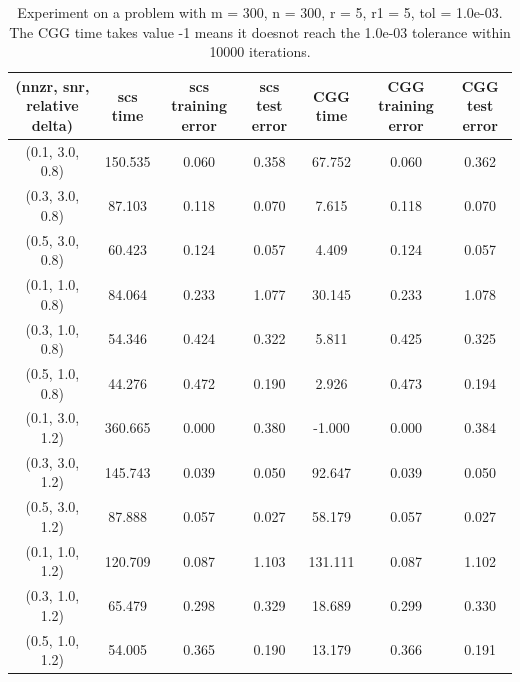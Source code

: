 \documentclass[english]{article}
\begin{document}
\begin{table}[H] 
	\centering
	\label{MC-side-information}
	\begin{tabular}{ccccccc}
		\toprule
		(nnzr, snr, relative delta) &scs time &scs training error &scs test error &CGG time &CGG training error &CGG test error\\ 
		\midrule 
		(0.1, 3.0, 0.8)& 150.535  &0.060  &0.358  &67.752  &0.060  &0.362 \\ 
		(0.3, 3.0, 0.8)& 87.103  &0.118  &0.070  &7.615  &0.118  &0.070 \\ 
		(0.5, 3.0, 0.8)& 60.423  &0.124  &0.057  &4.409  &0.124  &0.057 \\ 
		(0.1, 1.0, 0.8)& 84.064  &0.233  &1.077  &30.145  &0.233  &1.078 \\ 
		(0.3, 1.0, 0.8)& 54.346  &0.424  &0.322  &5.811  &0.425  &0.325 \\ 
		(0.5, 1.0, 0.8)& 44.276  &0.472  &0.190  &2.926  &0.473  &0.194 \\ 
		(0.1, 3.0, 1.2)& 360.665  &0.000  &0.380  &-1.000  &0.000  &0.384 \\ 
		(0.3, 3.0, 1.2)& 145.743  &0.039  &0.050  &92.647  &0.039  &0.050 \\ 
		(0.5, 3.0, 1.2)& 87.888  &0.057  &0.027  &58.179  &0.057  &0.027 \\ 
		(0.1, 1.0, 1.2)& 120.709  &0.087  &1.103  &131.111  &0.087  &1.102 \\ 
		(0.3, 1.0, 1.2)& 65.479  &0.298  &0.329  &18.689  &0.299  &0.330 \\ 
		(0.5, 1.0, 1.2)& 54.005  &0.365  &0.190  &13.179  &0.366  &0.191 \\ 
		\bottomrule
	\end{tabular}
	\caption{Experiment on a problem with m = 300, n = 300, r = 5, r1 = 5, tol = 1.0e-03. The CGG time takes value -1 means it doesnot reach the 1.0e-03 tolerance within 10000 iterations.}
\end{table}
\end{document}
